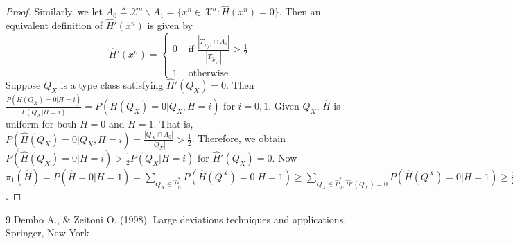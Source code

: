 \documentclass{article}
\begin{document}
\begin{proof}
Similarly, we let $A_0\triangleq \mathcal{X}^n \backslash A_1 = \{
x^n \in \mathcal{X}^n
: \widehat{H}(x^n) = 0
\}$. Then an equivalent definition of $\widehat{H}'(x^n)$ is given by
\begin{equation*}
\widehat{H}'(x^n)
= \begin{cases}
0 & \textrm{ if }  \frac{|T_{\hat{P}_{X^n}} \cap A_0|}{|T_{\hat{P}_{X^n}}|} > \frac{1}{2}\\
1 & \textrm{ otherwise}
\end{cases}
\end{equation*}
Suppose $Q_X$ is a type class satisfying $\widehat{H}'(Q_X)=0$.
Then $
\frac{P(\widehat{H}(Q_X)=0 | H=i)}{P(Q_X | H=i)}
= P(\widehat{H}(Q_X)=0 | Q_X, H = i)$ for $i=0,1$.
Given $Q_X$, $\widehat{H}$ is uniform for both $H=0$
and $H=1$. That is,
$P(\widehat{H}(Q_X)=0 | Q_X, H=i) = \frac{|Q_X \cap A_0|}{|Q_X|} > \frac{1}{2}$. Therefore,
we obtain $P(\widehat{H}(Q_X)=0|H=i) > \frac{1}{2}
P(Q_X|H=i)$ for $\widehat{H}'(Q_X)=0$.
Now $\pi_1(\widehat{H})=P(\widehat{H}=0|H=1)
=\sum_{Q_X \in \hat{P}_n^*}
P(\widehat{H}(Q^X)=0|H=1) \geq 
\sum_{Q_X \in \hat{P}_n^*, \widehat{H}'(Q_X)=0}
P(\widehat{H}(Q^X)=0|H=1)
\geq \frac{1}{2}
\sum_{Q_X \in \hat{P}_n^*, \widehat{H}'(Q_X)=0}
P(Q_X|H=i)=P(\widehat{H}'=0 | H=1)
=\pi_1(\widehat{H}')
$.
\end{proof}

\begin{thebibliography}{9}  
 Dembo A., \& Zeitoni O. (1998). Large deviations techniques and applications, Springer, New York

\end{thebibliography}
\end{document}
